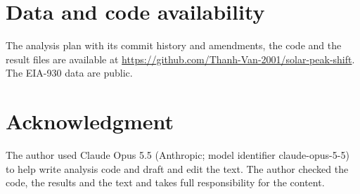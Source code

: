 \documentclass[conference,a4paper]{IEEEtran}
\newcommand{\repoURL}{https://github.com/Thanh-Van-2001/solar-peak-shift}
\begin{document}
\section*{Data and code availability}
The analysis plan with its commit history and amendments, the code and the result files are available at \url{\repoURL}. The EIA-930 data are public.

\section*{Acknowledgment}
The author used Claude Opus 5.5 (Anthropic; model identifier claude-opus-5-5) to help write analysis code and draft and edit the text. The author checked the code, the results and the text and takes full responsibility for the content.



\end{document}

